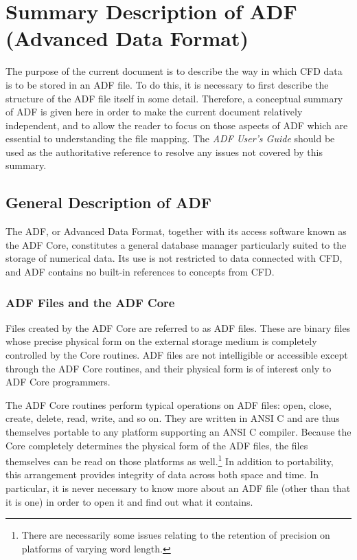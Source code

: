 \section{Summary Description of ADF (Advanced Data Format)}
\label{s:adfsummary}
\thispagestyle{plain}

The purpose of the current document is to describe the way in which
CFD data is to be stored in an ADF file.  To do this, it is necessary
to first describe the structure of the ADF file itself in some
detail. Therefore, a conceptual summary of ADF is given here in order
to make the current document relatively independent, and to allow
the reader to focus on those aspects of ADF which are essential to
understanding the file mapping.
The \textit{ADF User's Guide} should be used as the authoritative
reference to resolve any issues not covered by this summary.

\subsection{General Description of ADF}

The ADF, or Advanced Data Format, together with its access software
known as the ADF Core, constitutes a general database manager
particularly suited to the storage of numerical data. Its use is not
restricted to data connected with CFD, and ADF contains no built-in
references to concepts from CFD.

\subsubsection{ADF Files and the ADF Core}

Files created by the ADF Core are referred to as ADF files. These
are binary files whose precise physical form on the external storage
medium is completely controlled by the Core routines. ADF files are not
intelligible or accessible except through the ADF Core routines, and
their physical form is of interest only to ADF Core programmers.

The ADF Core routines perform typical operations on ADF files: open,
close, create, delete, read, write, and so on. They are written in ANSI
C and are thus themselves portable to any platform supporting an ANSI
C compiler. Because the Core completely determines the physical form
of the ADF files, the files themselves can be read on those platforms
as well.\footnote{There are necessarily some issues relating to the
retention of precision on platforms of varying word length.}  In
addition to portability, this arrangement provides integrity of data
across both space and time. In particular, it is never necessary to know
more about an ADF file (other than that it is one) in order to open it
and find out what it contains.

